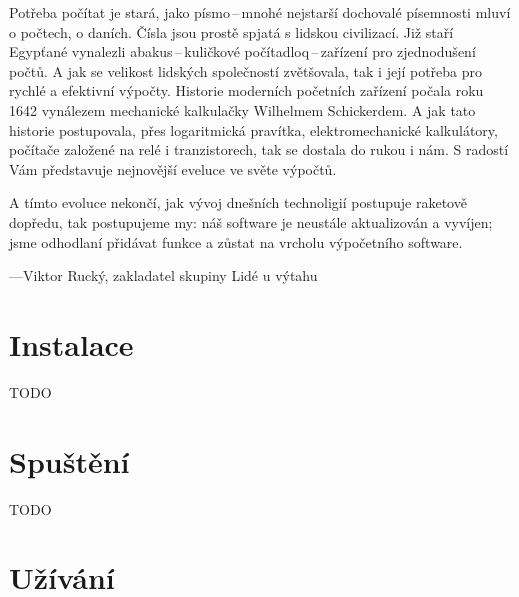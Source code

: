 \documentclass[a5paper,8pt,twoside]{extarticle}
\newcommand*\cleartoleftpage{%
  \clearpage
  \ifodd\value{page}\hbox{}\newpage\fi
}
\begin{document}
    Potřeba počítat je stará, jako písmo\,--\,mnohé nejstarší dochovalé písemnosti mluví o počtech, o daních. Čísla jsou prostě spjatá s lidskou civilizací. Již staří Egypťané vynalezli abakus\,--\,kuličkové počítadloq\,--\,zařízení pro zjednodušení počtů. A jak se velikost lidských společností zvětšovala, tak i její potřeba pro rychlé a efektivní výpočty. Historie moderních početních zařízení počala roku 1642 vynálezem mechanické kalkulačky Wilhelmem Schickerdem. A jak tato historie postupovala, přes logaritmická pravítka, elektromechanické kalkulátory, počítače založené na relé i tranzistorech, tak se dostala do rukou i nám. S radostí Vám představuje nejnovější eveluce ve světe výpočtů.

    A tímto evoluce nekončí, jak vývoj dnešních technoligií postupuje raketově dopředu, tak postupujeme my: náš software je neustále aktualizován a vyvíjen; jsme odhodlaní přidávat funkce a zůstat na vrcholu výpočetního software.
    
    ---Viktor Rucký, zakladatel skupiny Lidé u výtahu
    \newpage
    \section{Instalace}
    TODO
    \section{Spuštění}
    TODO
    \cleartoleftpage
    \section{Užívání}
\end{document}
